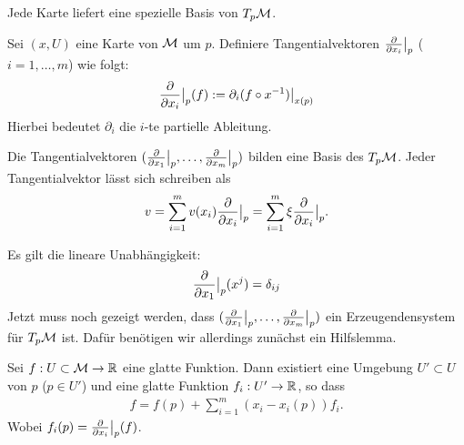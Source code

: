 Jede Karte liefert eine spezielle Basis von $T_p \mathcal{M}$.

\begin{defs}
Sei $(x, U)$ eine Karte von $\mathcal{M}$ um $p$. 
Definiere Tangentialvektoren $\pdv{x_i}\big\vert_{p} $ ($i = 1, \dots, m$) wie folgt:
\begin{align}
\pdv{x_i}\big\vert_{p} (f) := \partial_i (f \circ x^{-1}) \big\vert_{x(p)}
\end{align}
Hierbei bedeutet $\partial_i$ die $i$-te partielle Ableitung.
\end{defs}

\begin{satz}
\label{satz:BasisTPM}
Die Tangentialvektoren $(\pdv{x_1}\big\vert_{p}, \dots, \pdv{x_m}\big\vert_{p})$ bilden eine Basis des $T_{p} \mathcal{M}$.
Jeder Tangentialvektor lässt sich schreiben als
\begin{align}
v = \sum_{i=1}^{m} v(x_i) \pdv{x_i}\big\vert_{p} = \sum_{i=1}^{m} \xi \pdv{x_i}\big\vert_{p}.
\end{align}
\end{satz}
\begin{bew}
Es gilt die lineare Unabhängigkeit:
\begin{align}
\pdv{x_1}\big\vert_{p} (x^j) = \delta_{i j}
\end{align}
Jetzt muss noch gezeigt werden, dass $(\pdv{x_1}\big\vert_{p}, \dots, \pdv{x_m}\big\vert_{p})$ ein Erzeugendensystem für $T_{p} \mathcal{M}$ ist.
 Dafür benötigen wir allerdings zunächst ein Hilfslemma.
\end{bew}

\begin{hlem}
\label{lem:DarstellungBasisTPM}
Sei $f: U \subset \mathcal{M} \to \mathbb{R}$ eine glatte Funktion.
Dann existiert eine Umgebung $U' \subset U$ von $p$ ($p \in U'$) und eine glatte Funktion
$f_i: U' \to \mathbb{R}$, so dass
\begin{align}
f = f(p) + \sum_{i=1}^{m} ( x_i  - x_i(p)) f_i.
\end{align}
Wobei $f_i (p) = \pdv{x_i}\big\vert_{p} (f)$.
\end{hlem}

